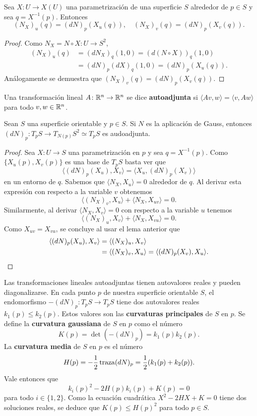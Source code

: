 \begin{lemma}
	\label{lem:N_u,N_v}
	Sea $X\colon U\to X(U)$ una parametrización de una superficie $S$ alrededor de $p\in S$ y sea $q=X^{-1}(p)$. 
	Entonces \[
		(N_X)_u(q)=(dN)_{p}(X_u(q)),\quad
		(N_X)_v(q)=(dN)_{p}(X_v(q)).
	\]
\end{lemma}

\begin{proof}
	Como $N_X=N\circ X\colon
	U\to S^2$, 
	\begin{align*}
		(N_X)_u(q)&=
		(dN_X)_{q}(1,0)
		=(d(N\circ X))_{q}(1,0)\\
		&=(dN)_{p}(dX)_{q}(1,0)
		=(dN)_p(X_u(q)).
	\end{align*}
	Análogamente se demuestra que $(N_X)_v(q)=(dN)_{p}(X_v(q))$. 
\end{proof}

Una transformación lineal $A\colon\mathbb{R}^n\to\mathbb{R}^n$ se dice \textbf{autoadjunta} si
$\langle Av,w\rangle=\langle v,Aw\rangle$ para todo $v,w\in\mathbb{R}^n$. 

\begin{theorem}
	Sean $S$ una superficie orientable y $p\in S$. Si $N$ es la aplicación de Gauss, entonces  
	$(dN)_p\colon T_pS\to T_{N(p)}S^2\simeq T_pS$ es audoadjunta. 
\end{theorem}

\begin{proof}
	Sea $X\colon U\to S$ una parametrización en $p$ y sea $q=X^{-1}(p)$. 
	Como $\{X_u(p),X_v(p)\}$ es una base de $T_pS$ basta ver que 
	\[
		\langle (dN)_p(X_u),X_v\rangle=\langle X_u,(dN)_p(X_v)\rangle
	\]
	en un entorno de $q$. 
	Sabemos que $\langle N_X,X_u\rangle=0$ alrededor de $q$. Al derivar esta expresión con
	respecto a la variable $v$ obtenemos 
	\[
		\langle (N_X)_v,X_u\rangle+\langle
	N_X,X_{uv}\rangle=0.
	\]
	Similarmente, al derivar $\langle N_X,X_v\rangle=0$ con
	respecto a la variable $u$ tenemos 
	\[
		\langle (N_X)_u,X_v\rangle+\langle
	N_X,X_{vu}\rangle=0. 
	\]
	Como $X_{uv}=X_{vu}$, 
	se concluye al usar el lema anterior que 
	\begin{align*}
		\langle (dN)_p(X_u),X_v\rangle
		&=\langle (N_X)_u,X_v\rangle\\
		&=\langle (N_X)_v,X_u\rangle
		=\langle (dN)_p(X_v),X_u\rangle.\qedhere
	\end{align*}
\end{proof}

Las transformaciones lineales autoadjuntas tienen autovalores reales y pueden
diagonalizarse. En cada punto $p$ de nuestra superficie orientable $S$, el
endomorfismo $-(dN)_p\colon T_pS\to T_pS$ tiene dos autovalores reales
$k_1(p)\leq k_2(p)$. Estos valores son las \textbf{curvaturas principales} de
$S$ en $p$.  Se define la \textbf{curvatura gaussiana} de $S$ en $p$ como el
número 
\[
K(p)=\det(-(dN)_p)=k_1(p)k_2(p).
\]
La \textbf{curvatura media} de $S$ en $p$ es el número 
\[
	H(p)=-\frac12\operatorname{traza}(dN)_p=\frac12(k_1(p)+k_2(p)).
\]
Vale entonces que 
\[
	k_i(p)^2-2H(p)k_i(p)+K(p)=0
\]
para todo $i\in\{1,2\}$. Como la ecuación cuadrática $X^2-2HX+K=0$ tiene dos
soluciones reales, se deduce que $K(p)\leq H(p)^2$ para todo $p\in S$.

